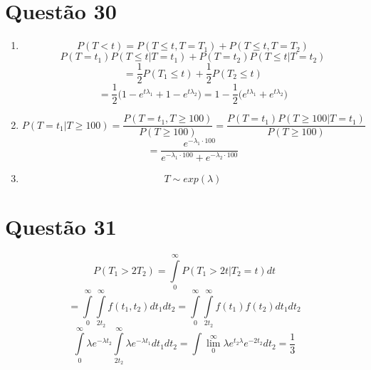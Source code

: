 \documentclass[a4paper,12pt]{report}
\begin{document}
	\section{Questão 30}
		\begin{enumerate}[label=\alph*)]
				\item $$P(T<t)=P(T\le t ,T=T_1) +P(T\le t ,T=T_2)  $$
				$$P(T=t_1)P(T\le t|T=t_1) + P(T=t_2)P(T\le t|T=t_2)$$
				$$= \frac{1}{2}P(T_1\le t) +\frac{1}{2}P(T_2\le t)   $$
				$$ = \frac{1}{2}\bigg(1-e^{t\lambda_1} +1-e^{t\lambda_2}\bigg)
				 = 1 - \frac{1}{2}\bigg(e^{t\lambda_1} +e^{t\lambda_2}\bigg)
				$$
				
				\item 
				
				$$P(T=t_1|T\ge 100) = \frac{P(T=t_1,T\ge 100)}{P(T\ge 100)}
				= \frac{P(T=t_1)P(T\ge 100|T=t_1)}{P(T\ge 100)} 
				 $$
				 $$
				 = \frac{e^{-\lambda_1 \cdot 100}}{e^{-\lambda_1 \cdot 100}+e^{-\lambda_2 \cdot 100}}
				 $$
				 \item $$T\sim exp(\lambda)$$
					\end{enumerate}
				
					\section*{Questão 31}
					
					$$P(T_1>2T_2) = \int\limits_0^\infty P(T_1>2t|T_2=t)dt $$
					$$= \int\limits_{0}^{\infty}\int\limits_{2t_2}^{\infty}f(t_1,t_2)dt_1 dt_2 = 
					\int\limits_{0}^{\infty}\int\limits_{2t_2}^{\infty}f(t_1)f(t_2)dt_1 dt_2
					 $$
					 $$
					 \int\limits_{0}^{\infty}\lambda e^{-\lambda t_2} \int\limits_{2t_2}^{\infty}\lambda e^{-\lambda t_1} dt_1 dt_2
					 = \int\lim\limits_{0}^\infty \lambda e^{t_2\lambda}e^{-2t_2}dt_2 = \frac{1}{3}
					 $$
														\newpage 
														
\end{document}
